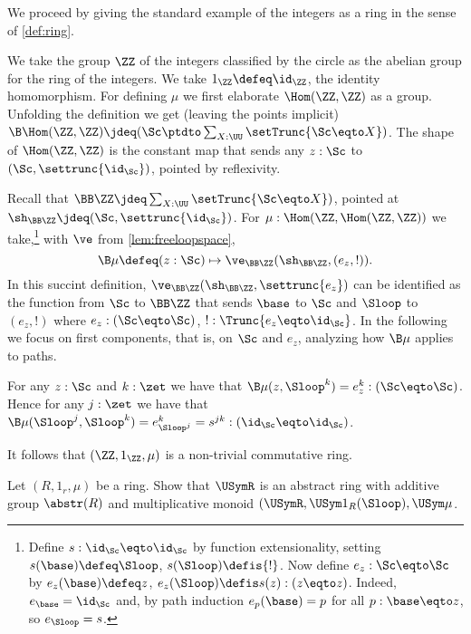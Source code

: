 We proceed by giving the standard example of the integers as a ring
in the sense of \cref{def:ring}.


\begin{example}
We take the group $\ZZ$ of the integers classified by the circle
as the abelian group for the ring of the integers.
We take $1_\ZZ \defeq \id_\ZZ$, the identity homomorphism.
For defining $\mu$ we first elaborate $\Hom(\ZZ,\ZZ)$ as a group.
Unfolding the definition we get (leaving the points implicit)
$\B\Hom(\ZZ,\ZZ) \jdeq(\Sc\ptdto\sum_{X:\UU}\setTrunc{\Sc\eqto X})$.
The shape of $\Hom(\ZZ,\ZZ)$ is the constant map 
that sends any $z:\Sc$ to $(\Sc,\settrunc{\id_{\Sc}})$, pointed by reflexivity.

Recall that $\BB\ZZ \jdeq \sum_{X:\UU}\setTrunc{\Sc\eqto X})$,
pointed at $\sh_{\BB\ZZ}\jdeq (\Sc,\settrunc{\id_\Sc})$.
For $\mu: \Hom(\ZZ,\Hom(\ZZ,\ZZ))$ we take,\footnote{
Define $s:\id_\Sc\eqto\id_\Sc$ by function extensionality,
setting $s(\base)\defeq\Sloop$, $s(\Sloop)\defis {!}$.
Now define $e_z: \Sc\eqto\Sc$ by $e_z(\base)\defeq z$,
$e_z(\Sloop) \defis s(z) : (z\eqto z)$. Indeed, $e_\base = \id_\Sc$
and, by path induction $e_p(\base)=p$ for all $p:\base\eqto z$,
so $e_{\Sloop} = s$.}
with $\ve$ from \cref{lem:freeloopspace},
\[
\B\mu \defeq (z:\Sc) \mapsto \ve_{\BB\ZZ}(\sh_{\BB\ZZ},(e_z,!)).
\]
In this succint definition, $\ve_{\BB\ZZ}(\sh_{\BB\ZZ},\settrunc{e_z})$
can be identified as the function from $\Sc$ to $\BB\ZZ$ that sends 
$\base$ to $\Sc$ and $\Sloop$ to $(e_z,!)$ where $e_z:(\Sc\eqto\Sc)$,
$!: \Trunc{e_z\eqto\id_\Sc}$. In the following we focus on first components,
that is, on $\Sc$ and $e_z$, analyzing how $\B\mu$ applies to paths.

For any $z:\Sc$ and $k:\zet$ we have that 
$\B\mu(z,{\Sloop}^k)= e_z^k : (\Sc\eqto\Sc)$.
Hence for any $j:\zet$ we have that 
$\B\mu({\Sloop}^j,{\Sloop}^k )= e_{{\Sloop}^j}^k = s^{jk}: (\id_\Sc\eqto\id_\Sc)$.




It follows that
$(\ZZ,1_\ZZ,\mu)$ is a non-trivial commutative ring.
\end{example}

\begin{xca}\label{xca:Rconcring->URabstring}
Let $(R,1_r,\mu)$ be a ring. Show that $\USymR$ is an abstract ring with
additive group $\abstr(R)$ and multiplicative monoid 
$(\USymR,\USym1_R(\Sloop),\USym\mu$. 
\end{xca}



